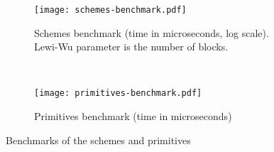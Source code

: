 \begin{figure}[ht!]
	\captionsetup[subfigure]{justification=centering}
	\centering
	\begin{subfigure}[t]{0.5\linewidth}
		\centering
		\texttt{[image: schemes-benchmark.pdf]}
		\setlength{\abovecaptionskip}{-5pt}
		\setlength{\belowcaptionskip}{-5pt}
		\caption{Schemes benchmark (time in microseconds, log scale). Lewi-Wu parameter is the number of blocks.}
	\end{subfigure}%
	~ %
	\begin{subfigure}[t]{0.5\linewidth}
		\centering
		\texttt{[image: primitives-benchmark.pdf]}
		\setlength{\abovecaptionskip}{-5pt}
		\setlength{\belowcaptionskip}{-5pt}
		\caption{Primitives benchmark (time in microseconds)}
	\end{subfigure}%
	\caption{Benchmarks of the schemes and primitives}\label{fig:benchmarks}
\end{figure}

